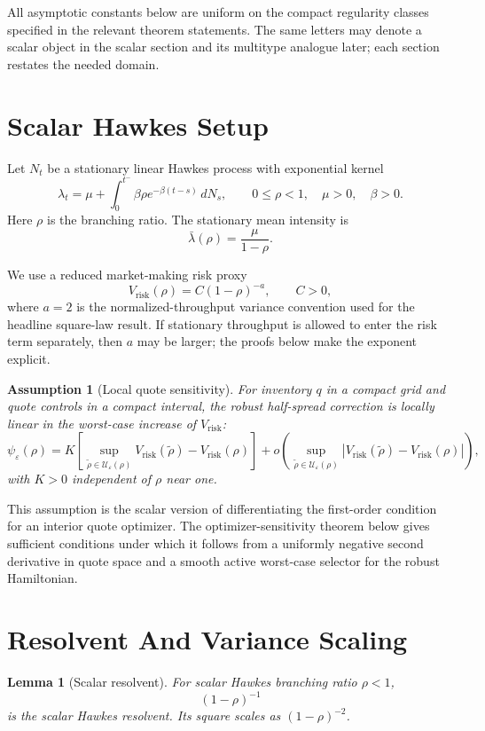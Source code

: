 \documentclass[11pt]{article}
\newtheorem{assumption}{Assumption}
\newtheorem{lemma}{Lemma}
\newcommand{\eps}{\varepsilon}
\begin{document}
All asymptotic constants below are uniform on the compact regularity classes
specified in the relevant theorem statements. The same letters may denote a
scalar object in the scalar section and its multitype analogue later; each
section restates the needed domain.

\section{Scalar Hawkes Setup}

Let $N_t$ be a stationary linear Hawkes process with exponential kernel
\[
\lambda_t = \mu + \int_0^{t^-}\beta \rho e^{-\beta(t-s)}\,dN_s,
\qquad
0\le \rho < 1,\quad \mu>0,\quad \beta>0.
\]
Here $\rho$ is the branching ratio. The stationary mean intensity is
\[
\bar\lambda(\rho)=\frac{\mu}{1-\rho}.
\]

We use a reduced market-making risk proxy
\[
V_{\mathrm{risk}}(\rho)=C(1-\rho)^{-a},
\qquad C>0,
\]
where $a=2$ is the normalized-throughput variance convention used for the
headline square-law result. If stationary throughput is allowed to enter the
risk term separately, then $a$ may be larger; the proofs below make the exponent
explicit.

\begin{assumption}[Local quote sensitivity]
For inventory $q$ in a compact grid and quote controls in a compact interval,
the robust half-spread correction is locally linear in the worst-case increase
of $V_{\mathrm{risk}}$:
\[
\psi_\eps(\rho)
=K\left[\sup_{\tilde\rho\in\mathcal U_\eps(\rho)}
V_{\mathrm{risk}}(\tilde\rho)-V_{\mathrm{risk}}(\rho)\right]
+o\left(\sup_{\tilde\rho\in\mathcal U_\eps(\rho)}
|V_{\mathrm{risk}}(\tilde\rho)-V_{\mathrm{risk}}(\rho)|\right),
\]
with $K>0$ independent of $\rho$ near one.
\end{assumption}

This assumption is the scalar version of differentiating the first-order
condition for an interior quote optimizer. The optimizer-sensitivity theorem
below gives sufficient conditions under which it follows from a uniformly
negative second derivative in quote space and a smooth active worst-case
selector for the robust Hamiltonian.

\section{Resolvent And Variance Scaling}

\begin{lemma}[Scalar resolvent]
For scalar Hawkes branching ratio $\rho<1$,
\[
(1-\rho)^{-1}
\]
is the scalar Hawkes resolvent. Its square scales as $(1-\rho)^{-2}$.
\end{lemma}
\end{document}
